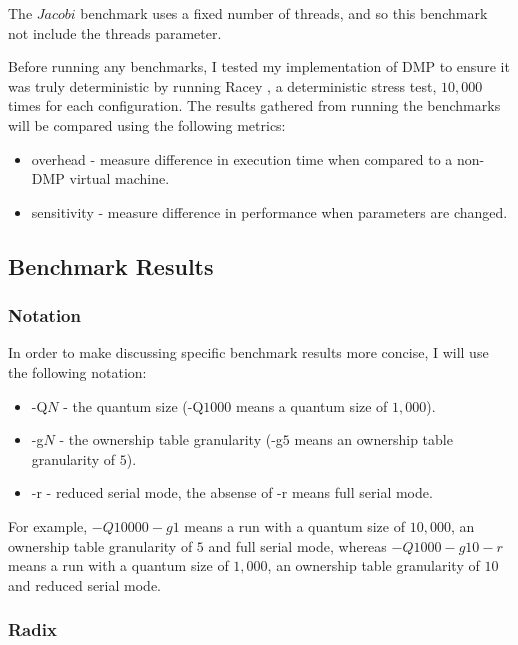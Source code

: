 The $Jacobi$ benchmark uses a fixed number of threads, and so this
benchmark not include the threads parameter.

Before running any benchmarks, I tested my implementation of DMP to
ensure it was truly deterministic by running Racey \cite{racey}, a
deterministic stress test, $10,000$ times for each configuration.  The
results gathered from running the benchmarks will be compared using
the following metrics:

\begin{itemize}
\item overhead - measure difference in execution time when compared to
  a non-DMP virtual machine.

\item sensitivity - measure difference in performance when parameters
  are changed.
\end{itemize}

\subsection{Benchmark Results}

\subsubsection{Notation}

In order to make discussing specific benchmark results more concise, I
will use the following notation:

\begin{itemize}
\item -Q$N$ - the quantum size (-Q$1000$ means a quantum size of
  $1,000$).

\item -g$N$ - the ownership table granularity (-g$5$ means an
  ownership table granularity of $5$).

\item -r - reduced serial mode, the absense of -r means full serial
  mode.
\end{itemize}

For example, $-Q10000 -g1$ means a run with a quantum size of
$10,000$, an ownership table granularity of $5$ and full serial mode,
whereas $-Q1000 -g10 -r$ means a run with a quantum size of $1,000$,
an ownership table granularity of $10$ and reduced serial mode.

\subsubsection{Radix}

